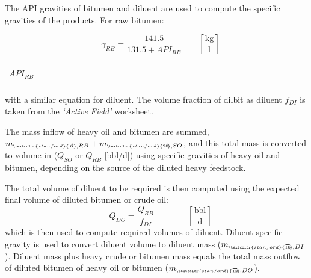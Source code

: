 \documentclass[11pt]{report}
\newcommand{\xlname}[1]{\raisebox{1pt}{\fcolorbox{light-gray}{light-gray}{\texttt{\textcolor{stanford}{\scriptsize{#1}}}}}}
\newcommand{\sheet}[1]{\textit{`{#1}'}}
\newcommand{\mstream}[1]{{\scriptscriptstyle{\textcolor{stanford}{\overrightarrow{#1}\!}}}}
\newcommand{\eqnunitfrac}[2]{\quad\quad \scriptstyle{\left[\frac{\text{#1}}{\text{#2}}\right]}}
\begin{document}
The API gravities of bitumen and diluent are used to compute the specific gravities of the products. For raw bitumen:

\begin{minipage}{0.6\columnwidth}
\begin{fleqn}[0pt]
\begin{equation}
\quad \gamma_{RB} = \frac{141.5}{131.5+API_{RB}} \eqnunitfrac{kg}{l}
\end{equation}
\end{fleqn}
\end{minipage}\hfill
\begin{minipage}{0.3\columnwidth}
        \begin{tabular}{|cl}
                        & \\
        $API_{RB}$       & \xlname{API\_Bitumen}\\
        & \\
        \end{tabular}
\end{minipage}


with a similar equation for diluent. The volume fraction of dilbit as diluent $f_{DI}$ is taken from the \sheet{Active Field} worksheet.  

The mass inflow of heavy oil and bitumen are summed, $m_{\mstream{6},RB} + m_{\mstream{20},SO}$, and this total mass is converted to volume in ($Q_{SO}$ or $Q_{RB}$ [bbl/d]) using specific gravities of heavy oil and bitumen, depending on the source of the diluted heavy feedstock. 

The total volume of diluent to be required is then computed using the expected final volume of diluted bitumen or crude oil:
\begin{equation}
 \quad Q_{DO} = \frac{Q_{RB}}{f_{DI}}  \quad\quad\eqnunitfrac{bbl}{d}
\end{equation}
which is then used to compute required volumes of diluent. Diluent specific gravity is used to convert diluent volume to diluent mass ($m_{\mstream{16},DI}$). Diluent mass plus heavy crude or bitumen mass equals the total mass outflow of diluted bitumen of heavy oil or bitumen ($m_{\mstream{12},DO}$).


\clearpage
\end{document}
